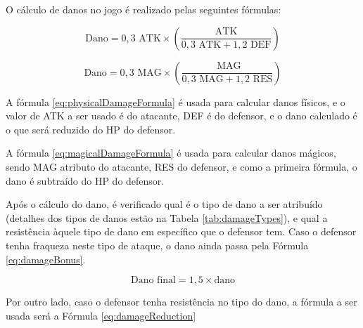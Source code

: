 \documentclass[
	12pt,					%
	openright,				%
	oneside,				%
	a4paper,				%
	bibjustif,				%
	chapter=TITLE,			%
	english,				%
	brazil,					%
	]{abntex2}
\begin{document}
	O cálculo de danos no jogo é realizado pelas seguintes fórmulas:
	
	\begin{equation}
		\textrm{Dano} = 0,3 \textrm{ ATK} \times \left(\frac{\textrm{ATK}}{0,3 \textrm{ ATK} + 1,2 \textrm{ DEF}}\right)
		\label{eq:physicalDamageFormula}
	\end{equation}
	
	\begin{equation}
		\textrm{Dano} = 0,3 \textrm{ MAG} \times \left(\frac{\textrm{ MAG}}{0,3 \textrm{ MAG} + 1,2 \textrm{ RES}}\right)
		\label{eq:magicalDamageFormula}
	\end{equation}
	
	\vspace{3mm}
	
	A fórmula \eqref{eq:physicalDamageFormula} é usada para calcular danos físicos,
	e o valor de ATK a ser usado é do atacante,
	DEF é do defensor,
	e o dano calculado é o que será reduzido do HP do defensor.
	
	A fórmula \eqref{eq:magicalDamageFormula} é usada para calcular danos mágicos,
	sendo MAG atributo do atacante,
	RES do defensor,
	e como a primeira fórmula, o dano é subtraído do HP do defensor.
	
	Após o cálculo do dano,
	é verificado qual é o tipo de dano a ser atribuído
	(detalhes dos tipos de danos estão na Tabela \ref{tab:damageTypes}),
	e qual a resistência àquele tipo de dano em específico que o defensor tem.
	Caso o defensor tenha fraqueza neste tipo de ataque,
	o dano ainda passa pela Fórmula \eqref{eq:damageBonus}.
	
	\begin{equation}
		\textrm{Dano final} = 1,5 \times \textrm{dano}
		\label{eq:damageBonus}
	\end{equation}
	
	\vspace{3mm}
	
	Por outro lado, caso o defensor tenha resistência no tipo do dano,
	a fórmula a ser usada será a Fórmula \eqref{eq:damageReduction}
	
\end{document}
